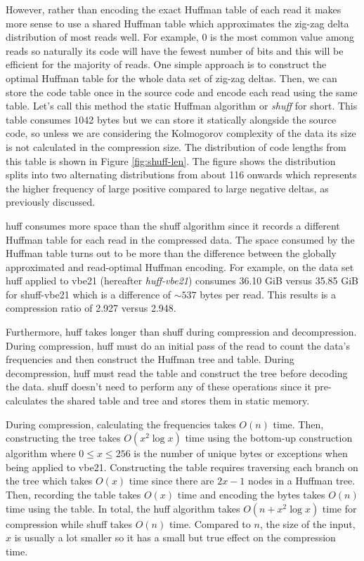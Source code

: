 However, rather than encoding the exact Huffman table of each read it makes more
sense to use a shared Huffman table which approximates the zig-zag delta
distribution of most reads well.
For example, 0 is the most common value among reads so naturally its code will
have the fewest number of bits and this will be efficient for the majority of
reads. One simple approach is to construct the optimal Huffman table for the
whole data set of zig-zag deltas. Then, we can store the code table once in the
source code and encode each read using the same table. Let's call this method
the static Huffman algorithm or \textit{shuff} for short. This table consumes
1042 bytes but we can store it statically alongside the source code, so unless
we are considering the Kolmogorov complexity of the data its size is not
calculated in the compression size. The distribution of code lengths from this
table is shown in Figure \ref{fig:shuff-len}. The figure shows the distribution
splits into two alternating distributions from about 116 onwards which
represents the higher frequency of large positive compared to large negative
deltas, as previously discussed.

huff consumes more space than the shuff algorithm since it records a different
Huffman table for each read in the compressed data. The space consumed by the
Huffman table turns out to be more than the difference between the globally
approximated and read-optimal Huffman encoding. For example, on the data set
huff applied to vbe21 (hereafter \textit{huff-vbe21}) consumes 36.10 GiB versus
35.85 GiB for shuff-vbe21 which is a difference of $\sim537$ bytes per read.
This results is a compression ratio of 2.927 versus 2.948.

Furthermore, huff takes longer than shuff during compression and decompression.
During compression, huff must do an initial pass of the read to count the data's
frequencies and then construct the Huffman tree and table. During
decompression, huff must read the table and construct the tree before decoding
the data. shuff doesn't need to perform any of these operations since it
pre-calculates the shared table and tree and stores them in static memory.

During compression, calculating the frequencies takes $O(n)$ time. Then,
constructing the tree takes $O(x^2\log x)$ time using the bottom-up construction
algorithm where $0\le x \le 256$ is the number of unique bytes or exceptions
when being applied to vbe21. Constructing the table requires traversing each
branch on the tree which takes $O(x)$ time since there are $2x-1$ nodes in a
Huffman tree. Then, recording the table takes $O(x)$ time and encoding the bytes
takes $O(n)$ time using the table. In total, the huff algorithm takes
$O(n + x^2\log x)$ time for compression while shuff takes $O(n)$ time. Compared
to $n$, the size of the input, $x$ is usually a lot smaller so it has a small
but true effect on the compression time.

